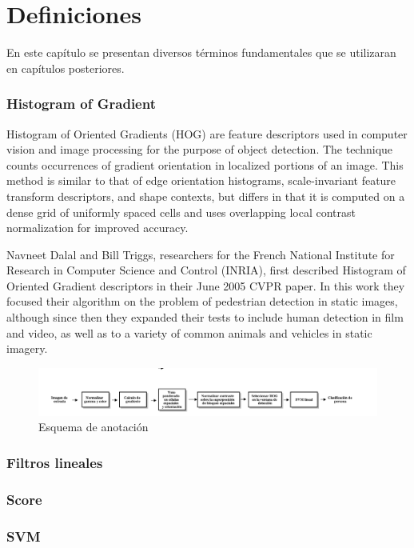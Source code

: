 \chapter[Definiciones ]{Definiciones }\label{ch:capitulo3}
En este capítulo se presentan diversos términos fundamentales que se utilizaran en capítulos posteriores.

\subsection{Histogram of Gradient}
\label{subsec:hog}
Histogram of Oriented Gradients (HOG) are feature descriptors used in computer vision and image processing for the purpose of object detection. The technique counts occurrences of gradient orientation in localized portions of an image. This method is similar to that of edge orientation histograms, scale-invariant feature transform descriptors, and shape contexts, but differs in that it is computed on a dense grid of uniformly spaced cells and uses overlapping local contrast normalization for improved accuracy.

Navneet Dalal and Bill Triggs, researchers for the French National Institute for Research in Computer Science and Control (INRIA), first described Histogram of Oriented Gradient descriptors in their June 2005 CVPR paper. In this work they focused their algorithm on the problem of pedestrian detection in static images, although since then they expanded their tests to include human detection in film and video, as well as to a variety of common animals and vehicles in static imagery.

\begin{figure}[h]
  \centering
   \includegraphics[width=1\textwidth]{Figuras/hog-procedure.png}
   \caption{Esquema de anotación}
   \label{fig:anota}
\end{figure}

\subsection{Filtros lineales}
\label{subsec:fl}

\subsection{Score}
\label{subsec:score}

\subsection{SVM}
